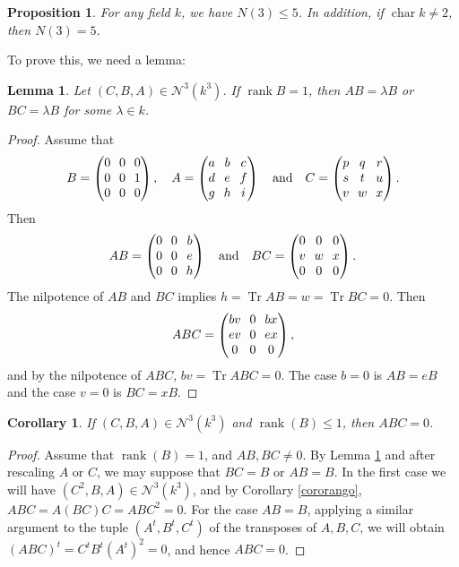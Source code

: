 \documentclass[11pt]{article}
\let\mathcal\mathscr
\theoremstyle{plain}
\newtheorem{prop}[teo]{Proposition}
\newtheorem{lema}[teo]{Lemma}
\newtheorem{coro}[teo]{Corollary}
\theoremstyle{definition}
\DeclareMathOperator{\Char}{char}
\DeclareMathOperator{\rank}{rank}
\DeclareMathOperator{\Tr}{Tr}
\begin{document}
\begin{prop}\label{casotres}
For any field $k$, we have $N(3)\leq 5$. In addition, if $\Char{k}\neq 2$, then $N(3)=5$.
\end{prop}
To prove this, we need a lemma:
\begin{lema}\label{lema3}
Let $(C,B,A)\in \mathcal{N}^{3}(k^{3})$. If $\rank{B}=1$, then $AB=\lambda B$ or $BC=\lambda B$ for some $\lambda \in k$.
\end{lema}
\begin{proof}
Assume that
\[\arraycolsep3.5pt
B=\begin{pmatrix}
0 & 0 & 0\\
0 & 0 & 1\\
0 & 0 & 0\\
\end{pmatrix},\quad A=\begin{pmatrix}
a & b & c\\
d & e & f\\
g & h & i\\
\end{pmatrix}\quad\text{and}\quad C=\begin{pmatrix}
p & q & r\\
s & t & u\\
v & w & x\\
\end{pmatrix}. 
\]
Then
\[\arraycolsep3.5pt
AB=\begin{pmatrix}
0 & 0 & b\\
0 & 0 & e\\
0 & 0 & h\\
\end{pmatrix}\quad\text{and}\quad BC=\begin{pmatrix}
0 & 0 & 0\\
v & w & x\\
0 & 0 & 0\\
\end{pmatrix}.
\]
The nilpotence of $AB$ and $BC$ implies $h=\Tr{AB}=w=\Tr{BC}=0$. Then
\[\arraycolsep3.5pt
ABC=\begin{pmatrix}
bv & 0 & bx\\
ev & 0 & ex\\
0 & 0 & 0\\
\end{pmatrix},
\]
and by the nilpotence of $ABC$, $bv=\Tr{ABC}=0$.
The case $b=0$ is $AB=eB$ and the case $v=0$ is $BC=xB$.
\end{proof}

\begin{coro}\label{cororango3}
If $(C,B,A) \in \mathcal{N}^{3}(k^{3})$ and $\rank(B)\leq 1$, then $ABC=0$.
\end{coro}
\begin{proof}
Assume that $\rank(B)=1$, and $AB, BC\neq 0$. By Lemma \ref{lema3} and after rescaling $A$ or $C$, we may suppose that $BC=B$ or $AB=B$. In the first case we will have $(C^2,B,A) \in \mathcal{N}^{3}(k^{3})$, and by Corollary \ref{cororango}, $ABC=A(BC)C=ABC^{2}=0$. For the case $AB=B$, applying a similar argument to the tuple $(A^{t},B^{t},C^{t})$ of the transposes of $A,B,C$, we will obtain $(ABC)^{t}=C^{t}B^{t}(A^{t})^{2}=0$, and hence \hbox{$ABC=0$}.
\end{proof}
\end{document}
